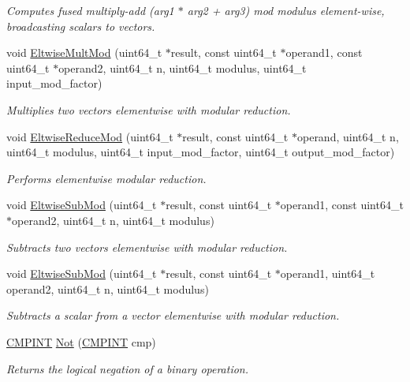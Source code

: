 \begin{DoxyCompactItemize}
\begin{DoxyCompactList}\small\item\em Computes fused multiply-\/add ({\ttfamily arg1} $\ast$ {\ttfamily arg2} + {\ttfamily arg3}) mod {\ttfamily modulus} element-\/wise, broadcasting scalars to vectors. \end{DoxyCompactList}\item 
void \hyperlink{namespaceintel_1_1hexl_a705bc0321d937ae4d1f8d50279e3cff1}{Eltwise\+Mult\+Mod} (uint64\+\_\+t $\ast$result, const uint64\+\_\+t $\ast$operand1, const uint64\+\_\+t $\ast$operand2, uint64\+\_\+t n, uint64\+\_\+t modulus, uint64\+\_\+t input\+\_\+mod\+\_\+factor)
\begin{DoxyCompactList}\small\item\em Multiplies two vectors elementwise with modular reduction. \end{DoxyCompactList}\item 
void \hyperlink{namespaceintel_1_1hexl_af3ddae165283841d495a322275baf5ee}{Eltwise\+Reduce\+Mod} (uint64\+\_\+t $\ast$result, const uint64\+\_\+t $\ast$operand, uint64\+\_\+t n, uint64\+\_\+t modulus, uint64\+\_\+t input\+\_\+mod\+\_\+factor, uint64\+\_\+t output\+\_\+mod\+\_\+factor)
\begin{DoxyCompactList}\small\item\em Performs elementwise modular reduction. \end{DoxyCompactList}\item 
void \hyperlink{namespaceintel_1_1hexl_a6a45c30bc21b9b1e1410b23fce5424c8}{Eltwise\+Sub\+Mod} (uint64\+\_\+t $\ast$result, const uint64\+\_\+t $\ast$operand1, const uint64\+\_\+t $\ast$operand2, uint64\+\_\+t n, uint64\+\_\+t modulus)
\begin{DoxyCompactList}\small\item\em Subtracts two vectors elementwise with modular reduction. \end{DoxyCompactList}\item 
void \hyperlink{namespaceintel_1_1hexl_abc13b8f383d3af6471a5261ee2213b40}{Eltwise\+Sub\+Mod} (uint64\+\_\+t $\ast$result, const uint64\+\_\+t $\ast$operand1, uint64\+\_\+t operand2, uint64\+\_\+t n, uint64\+\_\+t modulus)
\begin{DoxyCompactList}\small\item\em Subtracts a scalar from a vector elementwise with modular reduction. \end{DoxyCompactList}\item 
\hyperlink{namespaceintel_1_1hexl_abdcc9d2d5bb10fa95d5f143874508006}{C\+M\+P\+I\+NT} \hyperlink{namespaceintel_1_1hexl_a8c654502a5e7fe2cfdd198f0fd920f2a}{Not} (\hyperlink{namespaceintel_1_1hexl_abdcc9d2d5bb10fa95d5f143874508006}{C\+M\+P\+I\+NT} cmp)
\begin{DoxyCompactList}\small\item\em Returns the logical negation of a binary operation. \end{DoxyCompactList}\end{DoxyCompactItemize}


